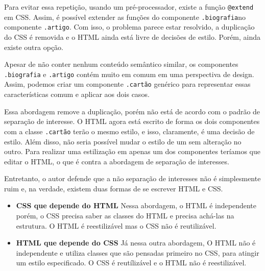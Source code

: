 Para evitar essa repetição, usando um pré-processador, existe a função
\texttt{@extend} em CSS. Assim, é possível extender as funções do
componente \texttt{.biografia}no componente \texttt{.artigo}. Com isso,
o problema parece estar resolvido, a duplicação do CSS é removida e o
HTML ainda está livre de decisões de estilo. Porém, ainda existe outra
opção.

Apesar de não conter nenhum conteúdo semântico similar, os componentes
\texttt{.biografia} e \texttt{.artigo} contém muito em comum em uma
perspectiva de design. Assim, podemos criar um componente
\texttt{.cartão} genérico para representar essas características comum e
aplicar aos dois casos.

\begin{Shaded}
\begin{Highlighting}[]
\KeywordTok{>} 
    \KeywordTok{>} 
\StringTok{        }\ErrorTok{<}\KeywordTok{>} 
        \KeywordTok{>} 
\end{Highlighting}
\end{Shaded}

Essa abordagem remove a duplicação, porém não está de acordo com o
padrão de separação de interesse. O HTML agora está escrito de forma os
dois componentes com a classe \texttt{.cartão} terão o mesmo estilo, e
isso, claramente, é uma decisão de estilo. Além disso, não seria
possível mudar o estilo de um sem alteração no outro. Para realizar uma
estilização em apenas um dos componentes teríamos que editar o HTML, o
que é contra a abordagem de separação de interesses.

Entretanto, o autor defende que a não separação de interesses não é
simplesmente ruim e, na verdade, existem duas formas de se escrever HTML
e CSS.

\begin{itemize}
\tightlist
\item
  \textbf{CSS que depende do HTML} Nessa abordagem, o HTML é
  independente porém, o CSS precisa saber as classes do HTML e precisa
  achá-las na estrutura. O HTML é reestilizável mas o CSS não é
  reutilizável.
\item
  \textbf{HTML que depende do CSS} Já nessa outra abordagem, O HTML não
  é independente e utiliza classes que são pensadas primeiro no CSS,
  para atingir um estilo especificado. O CSS é reutílizável e o HTML não
  é reestilizável.
\end{itemize}


